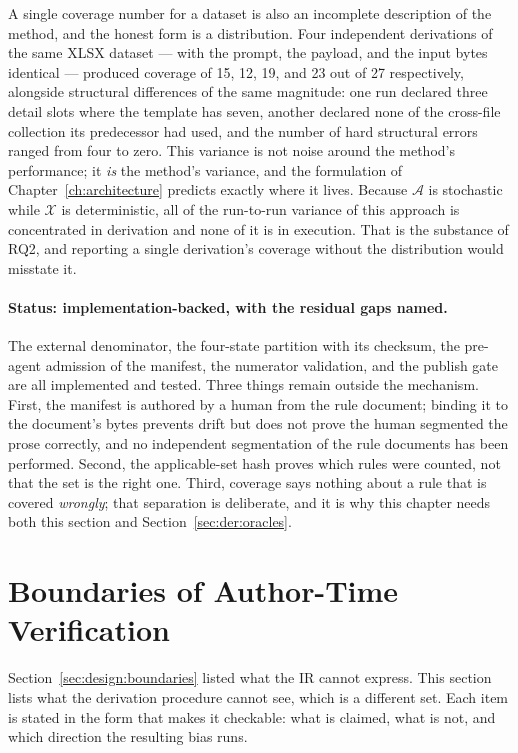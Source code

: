 A single coverage number for a dataset is also an incomplete description of the method, and the honest form
is a distribution. Four independent derivations of the same XLSX dataset --- with the prompt, the payload,
and the input bytes identical --- produced coverage of 15, 12, 19, and 23 out of 27 respectively, alongside
structural differences of the same magnitude: one run declared three detail slots where the template has
seven, another declared none of the cross-file collection its predecessor had used, and the number of hard
structural errors ranged from four to zero. This variance is not noise around the method's performance; it
\emph{is} the method's variance, and the formulation of Chapter~\ref{ch:architecture} predicts exactly where
it lives. Because $\mathcal{A}$ is stochastic while $\mathcal{X}$ is deterministic, all of the run-to-run
variance of this approach is concentrated in derivation and none of it is in execution. That is the
substance of RQ2, and reporting a single derivation's coverage without the distribution would misstate it.

\paragraph{Status: implementation-backed, with the residual gaps named.}
The external denominator, the four-state partition with its checksum, the pre-agent admission of the
manifest, the numerator validation, and the publish gate are all implemented and tested. Three things remain
outside the mechanism. First, the manifest is authored by a human from the rule document; binding it to the
document's bytes prevents drift but does not prove the human segmented the prose correctly, and no
independent segmentation of the rule documents has been performed. Second, the applicable-set hash proves
which rules were counted, not that the set is the right one. Third, coverage says nothing about a rule that
is covered \emph{wrongly}; that separation is deliberate, and it is why this chapter needs both this section
and Section~\ref{sec:der:oracles}.

\section{Boundaries of Author-Time Verification}
\label{sec:der:boundaries}

Section~\ref{sec:design:boundaries} listed what the IR cannot express. This section lists what the derivation
procedure cannot see, which is a different set. Each item is stated in the form that makes it checkable: what
is claimed, what is not, and which direction the resulting bias runs.

